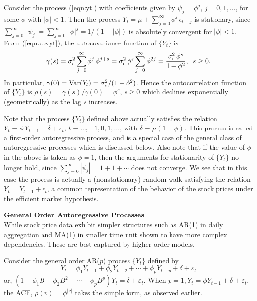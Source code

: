 \begin{ex}\label{ex:autoregor1}
Consider the process (\ref{eqn:yt}) with coefficients given by $\psi_j = \phi^j$, $j=0,1,\ldots$,  for some $\phi$ with $\lvert\phi\rvert<1$. Then the process $Y_t = \mu + \sum_{j=0}^{\infty} \phi^j \, \epsilon_{t-j}$ is stationary, since $\sum_{j=0}^{\infty} \, \lvert\psi_j\rvert= \sum_{j=0}^{\infty} \, \lvert\phi\rvert^j = 1/(1-\lvert\phi\rvert)$ is absolutely convergent for $\lvert\phi\rvert < 1$. From (\ref{eqn:covyt}), the autocovariance function of $\{Y_t\}$ is
	\[
	\gamma(s)= \sigma^2_{\epsilon} \sum_{j=0}^{\infty} \phi^j \, \phi^{j+s}= \sigma^2_{\epsilon} \, \phi^s \sum_{j=0}^{\infty} \phi^{2j}= \frac{\sigma^2_{\epsilon} \, \phi^s}{1 - \phi^2}, \enskip s \geq 0.
	\]
In particular, $\gamma(0) = \operatorname{Var}(Y_t) = \sigma^2_{\epsilon}/(1-\phi^2)$. Hence the autocorrelation function of $\{Y_t\}$ is $\rho(s)= \gamma(s)/\gamma(0)= \phi^s$, $ s \geq 0$ which declines exponentially (geometrically) as the lag $s$ increases.


Note that the process $\{Y_t\}$ defined above actually satisfies the relation $Y_t= \phi \, Y_{t-1} + \delta+\epsilon_t$, $t=\ldots,-1,0,1,\ldots$, with $\delta = \mu(1-\phi)$. This process is called a first-order autoregressive process, and is a special case of the general class of autoregressive processes which is discussed below. Also note that if the value of $\phi$ in the above is taken as  $\phi = 1$, then the arguments for stationarity of $\{Y_t\}$ no longer hold, since $\sum_{j=0}^{\infty} |\psi_j| = 1+1+\cdots$ does not converge. We see that in this case the process is actually a (nonstationary) random walk satisfying the relation  $Y_t = Y_{t-1}+\epsilon_t$, a common representation of the behavior of the stock prices under the efficient market hypothesis. 
\end{ex}


\noindent\textbf{General Order Autoregressive Processes} \\

While stock price data exhibit simpler structures such as AR(1) in daily aggregation and MA(1) in smaller time unit shown to have more complex dependencies. These are best captured by higher order models. 

Consider the general order AR($p$) process $\{Y_t\}$ defined by
	\begin{equation}\label{eqn:ytsum}
	Y_t = \phi_1Y_{t-1} + \phi_2Y_{t-2} +\cdots + \phi_pY_{t-p} + \delta + \varepsilon_t
	\end{equation}
or, $(1-\phi_1B - \phi_2B^2 - \cdots - \phi_pB^p)Y_t = \delta + \varepsilon_t$. When $p=1, Y_t = \phi Y_{t-1} + \delta + \varepsilon_t$, the ACF, $\rho(v)=\phi^{\lvert \nu \rvert}$ takes the simple form, as observed earlier.


